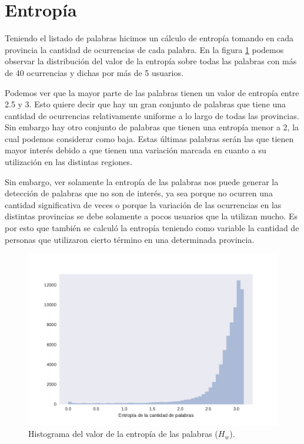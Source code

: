 
\section{Entropía}
Teniendo el listado de palabras hicimos un cálculo de entropía tomando en cada provincia la cantidad de ocurrencias de cada palabra. En la figura \ref{fig:entropiaPalabras} podemos observar la distribución del valor de la entropía sobre todas las palabras con más de 40 ocurrencias y dichas por más de 5 usuarios.

Podemos ver que la mayor parte de las palabras tienen un valor de entropía entre 2.5 y 3. Esto quiere decir que hay un gran conjunto de palabras que tiene una cantidad de ocurrencias relativamente uniforme a lo largo de todas las provincias. Sin embargo hay otro conjunto de palabras que tienen una entropía menor a 2, la cual podemos considerar como baja. Estas últimas palabras serán las que tienen mayor interés debido a que tienen una variación marcada en cuanto a su utilización en las distintas regiones.

Sin embargo, ver solamente la entropía de las palabras nos puede generar la detección de palabras que no son de interés, ya sea porque no ocurren una cantidad significativa de veces o porque la variación de las ocurrencias en las distintas provincias se debe solamente a pocos usuarios que la utilizan mucho. Es por esto que también se calculó la entropía teniendo como variable la cantidad de personas que utilizaron cierto término en una determinada provincia.


\begin{figure}[ht]
\centering
\includegraphics[width=1.0\textwidth]{./images/DistribucionEntropia.pdf}
\caption{Histograma del valor de la entropía de las palabras ($H_w$).} 
\label{fig:entropiaPalabras} 
\end{figure}



